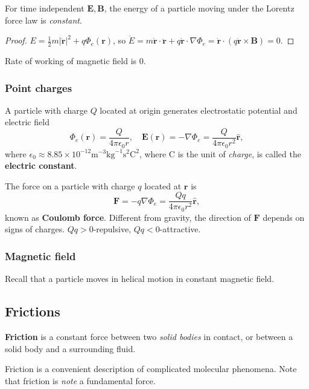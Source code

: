 \begin{proposition}
    For time independent $ \mathbf{E},\mathbf{B} $, the energy of a particle moving under the Lorentz force law is \textit{constant}.
\end{proposition}
\begin{proof}
    $ E = \frac{1}{2}m|\dot{\mathbf{r}}|^2+q\Phi_e(\mathbf{r}) $, so $ \dot{E}=m \dot{\mathbf{r}} \cdot \ddot{\mathbf{r}}+q \dot{\mathbf{r}}\cdot \nabla \Phi_e = \dot{\mathbf{r}}\cdot (q \dot{\mathbf{r}}\times \mathbf{B}) =0. $
\end{proof}
\begin{note}
    Rate of working of magnetic field is 0.
\end{note}

\subsubsection*{Point charges}
A particle with charge $Q$ located at origin generates electrostatic potential and electric field
\[
    \Phi_e(\mathbf{r}) = \frac{Q}{4\pi \epsilon_0 r},\quad \mathbf{E}(\mathbf{r}) = -\nabla \Phi_e = \frac{Q}{4\pi \epsilon_0 r^2} \hat{\mathbf{r}},
\]
where $ \epsilon_0 \approx 8.85 \times 10^{-12}\mathrm{m}^{-3}\mathrm{kg}^{-1}\mathrm{s}^2\mathrm{C}^2 $, where $ \mathrm{C} $ is the unit of \textit{charge}, is called the \textbf{electric constant}.

The force on a particle with charge $q$ located at $\mathbf{r}$ is 
\[
    \mathbf{F} = -q \nabla \Phi_e = \frac{Qq}{4\pi \epsilon_0 r^2}\hat{\mathbf{r}},
\]
known as \textbf{Coulomb force}. Different from gravity, the direction of $\mathbf{F}$ depends on signs of charges. $ Qq>0 $-repulsive, $ Qq<0 $-attractive.

\subsubsection*{Magnetic field}
Recall that a particle moves in helical motion in constant magnetic field.

\subsection{Frictions}
\begin{definition}
    \textbf{Friction} is a constant force between two \textit{solid bodies} in contact, or between a solid body and a surrounding fluid.
\end{definition}
\begin{note}
    Friction is a convenient description of complicated molecular phenomena. Note that friction is \textit{note} a fundamental force.
\end{note}

